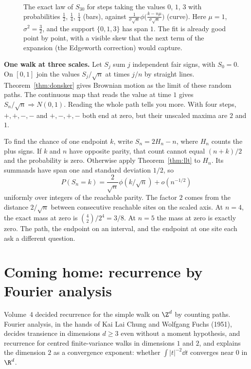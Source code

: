 \begin{figure}[ht]
\centering{}
\caption{The exact law of $S_{30}$ for steps taking the values $0$, $1$, $3$ with probabilities $\frac12$, $\frac14$, $\frac14$ (bars), against
$\frac1{\sigma\sqrt n}\phi\bigl(\frac{k-n\mu}{\sigma\sqrt n}\bigr)$ (curve). Here $\mu=1$, $\sigma^2=\frac32$, and the support $\{0,1,3\}$ has span $1$.
The fit is already good point by point, with a visible skew that the next term of the expansion (the Edgeworth correction) would capture.}
\label{fig:llt}
\end{figure}

\textbf{One walk at three scales.} Let $S_j$ sum $j$ independent fair signs, with $S_0=0$. On $[0,1]$ join the values $S_j/\sqrt n$ at times $j/n$ by straight lines. Theorem~\ref{thm:donsker} gives Brownian motion as the limit of these random paths. The continuous map that reads the value at time $1$ gives $S_n/\sqrt n\Rightarrow N(0,1)$. Reading the whole path tells you more. With four steps, $+,+,-,-$ and $+,-,+,-$ both end at zero, but their unscaled maxima are $2$ and $1$.

To find the chance of one endpoint $k$, write $S_n=2H_n-n$, where $H_n$ counts the plus signs. If $k$ and $n$ have opposite parity, that count cannot equal $(n+k)/2$ and the probability is zero. Otherwise apply Theorem~\ref{thm:llt} to $H_n$. Its summands have span one and standard deviation $1/2$, so
\[
P(S_n=k)=\frac{2}{\sqrt n}\phi(k/\sqrt n)+o(n^{-1/2})
\]
uniformly over integers of the reachable parity. The factor $2$ comes from the distance $2/\sqrt n$ between consecutive reachable sites on the scaled axis. At $n=4$, the exact mass at zero is $\binom42/2^4=3/8$. At $n=5$ the mass at zero is exactly zero. The path, the endpoint on an interval, and the endpoint at one site each ask a different question.

\section{Coming home: recurrence by Fourier analysis}

Volume~4 decided recurrence for the simple walk on $\Z^d$ by counting paths. Fourier analysis, in the hands of Kai Lai Chung and Wolfgang Fuchs (1951), decides transience in dimensions $d\ge3$ even without a moment hypothesis, and recurrence for centred finite-variance walks in dimensions $1$ and $2$, and explains the dimension $2$ as a convergence exponent: whether $\int|t|^{-2}\dd t$ converges near $0$ in $\R^d$.

